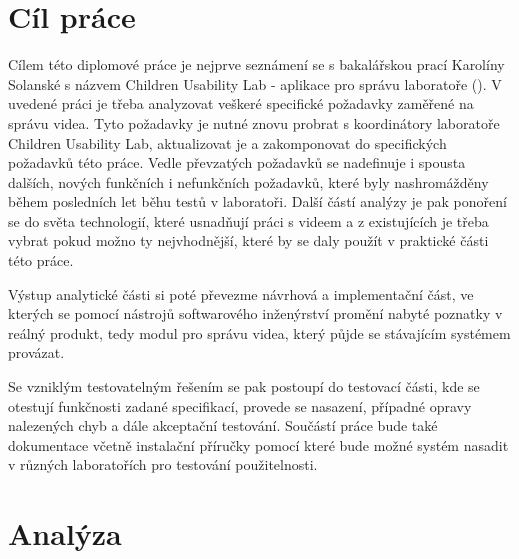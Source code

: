 \documentclass[thesis=M,czech]{FITthesis}[2012/06/26]
\begin{document}
\chapter{Cíl práce}
Cílem této diplomové práce je nejprve seznámení se s bakalářskou prací Karolíny Solanské s názvem Children Usability Lab - aplikace pro správu laboratoře (\cite{solankar}). V uvedené práci je třeba analyzovat veškeré specifické požadavky zaměřené na správu videa. Tyto požadavky je nutné znovu probrat s koordinátory  laboratoře Children Usability Lab, aktualizovat je a zakomponovat do specifických požadavků této práce. Vedle převzatých požadavků se nadefinuje i spousta dalších, nových funkčních i nefunkčních požadavků, které byly nashromážděny během posledních let běhu testů v laboratoři. Další částí analýzy je pak ponoření se do světa technologií, které usnadňují práci s videem a z existujících je třeba vybrat pokud možno ty nejvhodnější, které by se daly použít v praktické části této práce.
	
	Výstup analytické části si poté převezme návrhová a implementační část, ve kterých se pomocí nástrojů softwarového inženýrství promění nabyté poznatky v reálný produkt, tedy modul pro správu videa, který půjde se stávajícím systémem provázat.
	
	Se vzniklým testovatelným řešením se pak postoupí do testovací části, kde se otestují funkčnosti zadané specifikací, provede se nasazení, případné opravy nalezených chyb a dále akceptační testování.
Součástí práce bude také dokumentace včetně instalační příručky pomocí které bude možné systém nasadit v různých laboratořích pro testování použitelnosti.

\chapter{Analýza}
\end{document}
